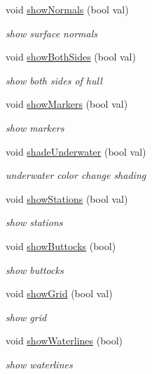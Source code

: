 \begin{DoxyCompactItemize}
void \hyperlink{classShipCAD_1_1Controller_adb1d1402849db292b29ec78ba89639d9}{show\-Normals} (bool val)
\begin{DoxyCompactList}\small\item\em show surface normals \end{DoxyCompactList}\item 
void \hyperlink{classShipCAD_1_1Controller_a798c513f6454b27141c93bb7a9681394}{show\-Both\-Sides} (bool val)
\begin{DoxyCompactList}\small\item\em show both sides of hull \end{DoxyCompactList}\item 
void \hyperlink{classShipCAD_1_1Controller_a89d94deb40f340ce439d53c781f72bcf}{show\-Markers} (bool val)
\begin{DoxyCompactList}\small\item\em show markers \end{DoxyCompactList}\item 
void \hyperlink{classShipCAD_1_1Controller_af090412ce033ebbe20c148f3236b8c8e}{shade\-Underwater} (bool val)
\begin{DoxyCompactList}\small\item\em underwater color change shading \end{DoxyCompactList}\item 
void \hyperlink{classShipCAD_1_1Controller_a429e378ef93bf0ec59c7dac048d4b100}{show\-Stations} (bool val)
\begin{DoxyCompactList}\small\item\em show stations \end{DoxyCompactList}\item 
void \hyperlink{classShipCAD_1_1Controller_abf2b642e176da1fd768eaf7952fc80bf}{show\-Buttocks} (bool)
\begin{DoxyCompactList}\small\item\em show buttocks \end{DoxyCompactList}\item 
void \hyperlink{classShipCAD_1_1Controller_ace6b3dde2f577bb95873ece93bcc9a5a}{show\-Grid} (bool val)
\begin{DoxyCompactList}\small\item\em show grid \end{DoxyCompactList}\item 
void \hyperlink{classShipCAD_1_1Controller_a634c01cbbf932acc8115357f3967bd9e}{show\-Waterlines} (bool)
\begin{DoxyCompactList}\small\item\em show waterlines \end{DoxyCompactList}\item 

\end{DoxyCompactItemize}
